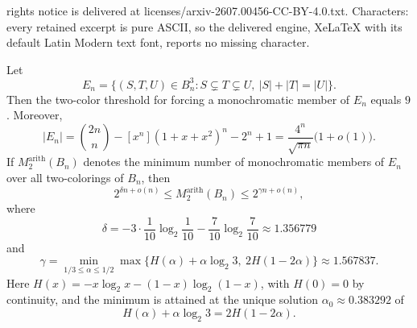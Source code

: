 \documentclass[10pt,a4paper]{amsart}
\begin{document}
rights notice is delivered at licenses/arxiv-2607.00456-CC-BY-4.0.txt. Characters: every retained excerpt is pure ASCII, so the delivered engine, XeLaTeX with its default Latin Modern text font, reports no missing character.
\begin{theorem}\label{thm:main}
Let
\[
 E_n=\{(S,T,U)\in B_n^3:S\subsetneq T\subsetneq U,\ |S|+|T|=|U|\}.
\]
Then the two-color threshold for forcing a monochromatic member of $E_n$ equals $9$. Moreover,
\[
|E_n|
=\binom{2n}{n}-[x^n](1+x+x^2)^n-2^n+1
=\frac{4^n}{\sqrt{\pi n}}\bigl(1+o(1)\bigr).
\]
If $M^{\mathrm{arith}}_2(B_n)$ denotes the minimum number of monochromatic members of $E_n$ over all two-colorings of $B_n$, then
\[
2^{\delta n+o(n)}
\leq M^{\mathrm{arith}}_2(B_n)
\leq 2^{\gamma n+o(n)},
\]
where
\[
\delta=-3\cdot\frac1{10}\log_2\frac1{10}-\frac7{10}\log_2\frac7{10}
      \approx 1.356779
\]
and
\[
\gamma=\min_{1/3\leq\alpha\leq1/2}
\max\{H(\alpha)+\alpha\log_2 3,\ 2H(1-2\alpha)\}
      \approx 1.567837.
\]
Here $H(x)=-x\log_2 x-(1-x)\log_2(1-x)$, with $H(0)=0$ by continuity, and the minimum is attained at the unique solution $\alpha_0\approx0.383292$ of
\[
H(\alpha)+\alpha\log_2 3=2H(1-2\alpha).
\]
\end{theorem}
\end{document}
